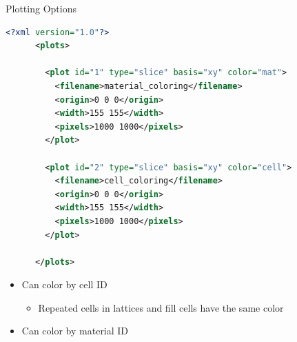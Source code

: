 \begin{frame}[fragile]{Plotting Options}

  \begin{scriptsize}
    \begin{lstlisting}[language=XML,gobble=4]
      <?xml version="1.0"?>
      <plots>

        <plot id="1" type="slice" basis="xy" color="mat">
          <filename>material_coloring</filename>
          <origin>0 0 0</origin>
          <width>155 155</width>
          <pixels>1000 1000</pixels>
        </plot>
        
        <plot id="2" type="slice" basis="xy" color="cell">
          <filename>cell_coloring</filename>
          <origin>0 0 0</origin>
          <width>155 155</width>
          <pixels>1000 1000</pixels>
        </plot>
        
      </plots>
    \end{lstlisting}
  \end{scriptsize}

  \begin{itemize}
    \item Can color by cell ID
    \begin{itemize}
      \item Repeated cells in lattices and fill cells have the same color
    \end{itemize}
    \item Can color by material ID
  \end{itemize}
  
  
\end{frame}

